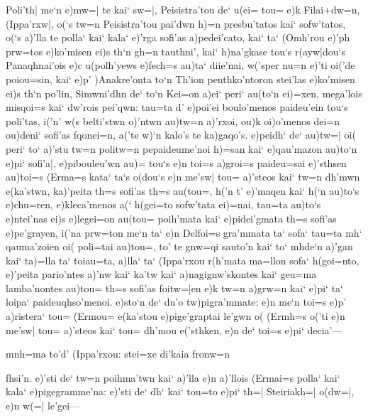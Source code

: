 \documentclass[11pt]{book}
\newcommand {\Spag} {\Npag*{=+1}\Npar{1}\numerus{1}}
\newcommand {\Spar} {\Npar*{=+1}\numerus{1}}
\begin{document}
\1 Poli'th| me`n e)mw=| te kai` sw=|, Peisistra'tou de` u(ei= tou= e)k
Filai+dw=n, (Ippa'rxw|, o(`s tw=n Peisistra'tou pai'dwn h)=n presbu'tatos
kai` sofw'tatos, o(`s a)'lla te polla` kai` kala` e)'rga sofi'as a)pedei'cato,
kai` ta` (Omh'rou e)'ph prw=tos e)ko'misen ei)s th`n gh=n tauthni', kai`
h)na'gkase tou`s r(ayw|dou`s Panaqhnai'ois e)c u(polh'yews e)fech=s au)ta`
diie'nai, w('sper nu=n e)'ti
\Spar %
oi('de poiou=sin, kai` e)p' )Anakre'onta to`n Th'ion penthko'ntoron
stei'las e)ko'misen ei)s th`n po'lin, Simwni'dhn de` to`n Kei=on a)ei` peri`
au(to`n ei)=xen, mega'lois misqoi=s kai` dw'rois pei'qwn: tau=ta d' e)poi'ei
boulo'menos paideu'ein tou`s poli'tas, i('n' w(s belti'stwn o)'ntwn au)tw=n
a)'rxoi, ou)k oi)o'menos dei=n ou)deni` sofi'as fqonei=n, a('te w)`n kalo's te
ka)gaqo's. e)peidh` de` au)tw=| oi( peri` to` a)'stu tw=n politw=n
pepaideume'noi h)=san kai`
\Spar %
 e)qau'mazon au)to`n e)pi` sofi'a|, e)pibouleu'wn au)= tou`s e)n toi=s
a)groi=s paideu=sai e)'sthsen au)toi=s (Erma=s kata` ta`s o(dou`s e)n me'sw|
tou= a)'steos kai` tw=n dh'mwn e(ka'stwn, ka)'peita th=s sofi'as th=s au(tou=,
h('n t' e)'maqen kai` h(`n au)to`s e)chu=ren, e)kleca'menos a(` h(gei=to
sofw'tata ei)=nai, tau=ta au)to`s e)ntei'nas ei)s e)legei=on au(tou= poih'mata
kai` e)pidei'gmata th=s sofi'as e)pe'grayen,
\Spar %
 i('na prw=ton me`n ta` e)n Delfoi=s gra'mmata ta` sofa` tau=ta mh`
qauma'zoien oi( poli=tai au)tou=, to' te gnw=qi sauto'n kai` to` mhde`n a)'gan
kai` ta)=lla ta` toiau=ta, a)lla` ta` (Ippa'rxou r(h'mata ma=llon sofa`
h(goi=nto, e)'peita pario'ntes a)'nw kai` ka'tw kai` a)nagignw'skontes kai`
geu=ma lamba'nontes au)tou= th=s sofi'as foitw=|en e)k tw=n a)grw=n kai` e)pi`
ta` loipa` paideuqhso'menoi. e)sto`n de` du'o tw)pigra'mmate: e)n me`n toi=s
\Spag %
 e)p' a)ristera` tou= (Ermou= e(ka'stou e)pige'graptai le'gwn o(
(Ermh=s o('ti e)n me'sw| tou= a)'steos kai` tou= dh'mou e('sthken, e)n de`
toi=s e)pi` decia'--- 

\versus
\qquad mnh=ma to'd' (Ippa'rxou: stei=xe di'kaia fronw=n
\endversus

fhsi'n.  e)'sti de` tw=n poihma'twn kai` a)'lla e)n a)'llois (Ermai=s
polla` kai` kala` e)pigegramme'na: e)'sti de` dh` kai` tou=to e)pi`
th=| Steiriakh=| o(dw=|, e)n w(=| le'gei---
\end{document}
